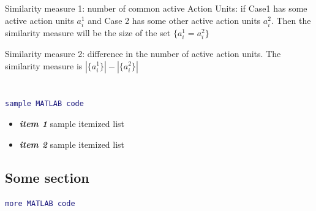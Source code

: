 \documentclass[a4paper,12pt,oneside,final]{report}
\newenvironment{changemargin}[2]{\begin{list}{}{%
\setlength{\topsep}{0pt}%
\setlength{\leftmargin}{0pt}%
\setlength{\rightmargin}{0pt}%
\setlength{\listparindent}{\parindent}%
\setlength{\itemindent}{\parindent}%
\setlength{\parsep}{0pt plus 1pt}%
\addtolength{\leftmargin}{#1}%
\addtolength{\rightmargin}{#2}%
}\item }{\end{list}}
\begin{document}
Similarity measure 1: number of common active Action Units: if Case1 has some active action units $a^{1}_{i}$ and Case 2 has some other active action units $a^{2}_{i}$.  Then the similarity measure will be the size of the set $\{ a^{1}_{i} = a^{2}_{i}\}$

Similarity measure 2: difference in the number of active action units.  The similarity measure is $|\{a^{1}_{i}\}| - |\{a^{2}_{i}\}|$
\paragraph{}

\chapter{}
\paragraph{}
\section{}
\paragraph{} 
\begin{changemargin}{-5mm}{-5mm}
\begin{lstlisting}[language=Matlab, frame=single]
sample MATLAB code
\end{lstlisting}
\end{changemargin}
\label{ch:build}
\begin{itemize}
\item {\bf \textit{item 1} } sample itemized list
\item {\bf \textit{item 2} } sample itemized list
\end{itemize}

\paragraph{}
\paragraph{}
\section{Some section}
\begin{changemargin}{-5mm}{-5mm}
\begin{lstlisting}[language=Matlab, frame=single]
more MATLAB code
\end{lstlisting}
\end{changemargin}
\end{document}
